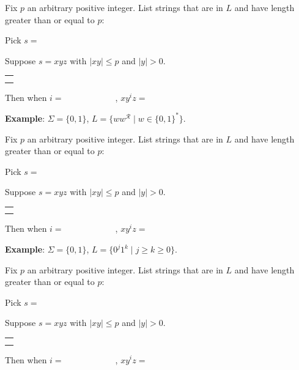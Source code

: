 \documentclass[12pt, oneside]{article}
\begin{document}
Fix $p$ an arbitrary positive integer. List strings that are in $L$ and have length  greater than or equal  to $p$:

\vspace{20pt}

Pick $s = $


Suppose $s = xyz$ with  $|xy|  \leq  p$ and $|y| > 0$.
\begin{center}
\begin{tabular}{|c|}
\hline
 \\
\hspace{4in} \\
\hline
\end{tabular}
\end{center}

Then when $i = \hspace{1in}$, $xy^i z  = \hspace{1in}$

\newpage

{\bf Example}: $\Sigma  =  \{0,1\}$, $L = \{w w^{\mathcal{R}} \mid w \in \{0,1\}^*\}$.

Fix $p$ an arbitrary positive integer. List strings that are in $L$ and have length  greater than or equal  to $p$:

\vspace{10pt}

Pick $s = $

Suppose $s = xyz$ with  $|xy|  \leq  p$ and $|y| > 0$.
\begin{center}
\begin{tabular}{|c|}
\hline
 \\
\hspace{4in} \\
\hline
\end{tabular}
\end{center}
Then when $i = \hspace{1in}$, $xy^i z  = \hspace{1in}$


\vspace{30pt} 

{\bf Example}: $\Sigma  =  \{0,1\}$, $L = \{0^j1^k  \mid j \geq k  \geq 0\}$.

Fix $p$ an arbitrary positive integer. List strings that are in $L$ and have length  greater than or equal  to $p$:

\vspace{10pt}

Pick $s = $


Suppose $s = xyz$ with  $|xy|  \leq  p$ and $|y| > 0$.
\begin{center}
\begin{tabular}{|c|}
\hline
 \\
\hspace{4in} \\
\hline
\end{tabular}
\end{center}
Then when $i = \hspace{1in}$, $xy^i z  = \hspace{1in}$
\end{document}
